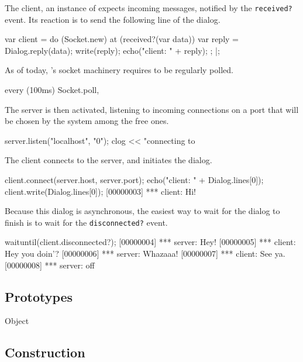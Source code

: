 The client, an instance of  expects incoming
messages, notified by the \lstinline|received?| event.  Its reaction
is to send the following line of the dialog.

\begin{urbiscript}
var client =
  do (Socket.new)
  {
    at (received?(var data))
    {
      var reply = Dialog.reply(data);
      write(reply);
      echo("client: " + reply);
    };
  }|;
\end{urbiscript}

As of today, \us's socket machinery requires to be regularly polled.

\begin{urbiscript}
every (100ms)
  Socket.poll,
\end{urbiscript}

The server is then activated, listening to incoming connections on a port
that will be chosen by the system among the free ones.

\begin{urbiscript}
server.listen("localhost", "0");
clog << "connecting to %
\end{urbiscript}

The client connects to the server, and initiates the dialog.

\begin{urbiscript}
client.connect(server.host, server.port);
echo("client: " + Dialog.lines[0]);
client.write(Dialog.lines[0]);
[00000003] *** client: Hi!
\end{urbiscript}

Because this dialog is asynchronous, the easiest way to wait for the
dialog to finish is to wait for the \lstinline|disconnected?| event.

\begin{urbiscript}
waituntil(client.disconnected?);
[00000004] *** server: Hey!
[00000005] *** client: Hey you doin'?
[00000006] *** server: Whazaaa!
[00000007] *** client: See ya.
[00000008] *** server: off
\end{urbiscript}

\subsection{Prototypes}
\begin{refObjects}
\item[Object]
\end{refObjects}

\subsection{Construction}

